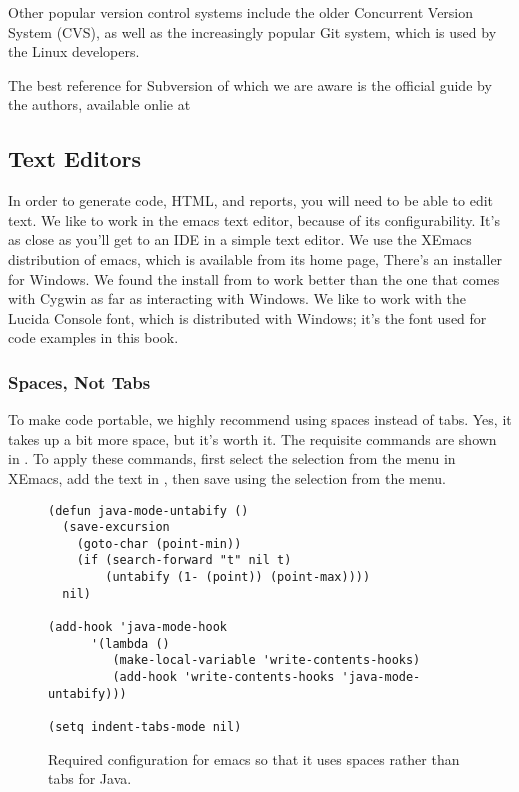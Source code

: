 Other popular version control systems include the older Concurrent
Version System (CVS), as well as the increasingly popular Git system,
which is used by the Linux developers.

The best reference for Subversion of which we are aware is the
official guide by the authors, available onlie at 
%


\subsection{Text Editors}

In order to generate code, HTML, and reports, you will need to be able
to edit text.  We like to work in the emacs text editor, because of
its configurability.  It's as close as you'll get to an IDE in a
simple text editor.  We use the XEmacs distribution of emacs, which is
available from its home page,
%
%
There's an installer for Windows.  We found the install from
 to work better than the one that comes with Cygwin
as far as interacting with Windows.  We like to work with the Lucida
Console font, which is distributed with Windows; it's the font used
for code examples in this book.

\subsubsection{Spaces, Not Tabs}

To make code portable, we highly recommend using spaces instead of
tabs.  Yes, it takes up a bit more space, but it's worth it.  The
requisite commands are shown in .  To apply these
commands, first select the  selection from
the  menu in XEmacs, add the text in
, then save using the  selection from the  menu.

\begin{figure}
\begin{verbatim}
(defun java-mode-untabify ()
  (save-excursion
    (goto-char (point-min))
    (if (search-forward "t" nil t)
        (untabify (1- (point)) (point-max))))
  nil)

(add-hook 'java-mode-hook
      '(lambda ()
         (make-local-variable 'write-contents-hooks)
         (add-hook 'write-contents-hooks 'java-mode-untabify)))

(setq indent-tabs-mode nil)\end{verbatim}\vspace*{-12pt}%
\caption{Required configuration for emacs so that it uses spaces rather than tabs for Java.}\label{fig:emacs-tabs}%
\end{figure}



